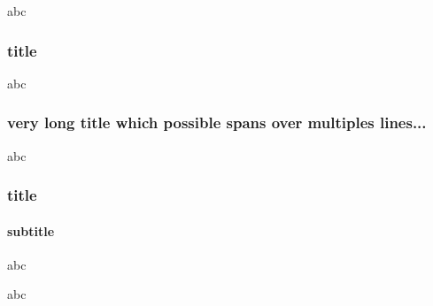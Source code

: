 \documentclass{beamer}
\begin{document}
\begin{frame}
    abc
\end{frame} 

\begin{frame}
\frametitle{title}
    abc
\end{frame} 

\begin{frame}
\frametitle{very long title which possible spans over multiples lines...}
    abc
\end{frame} 

\begin{frame}
\frametitle{title}
\framesubtitle{subtitle}
    abc
\end{frame} 


\begin{frame}
    abc
\end{frame} 
\end{document}
